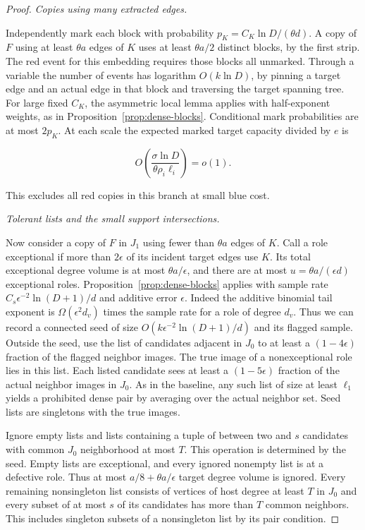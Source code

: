 \documentclass[11pt]{amsart}
\theoremstyle{definition}
\theoremstyle{remark}
\numberwithin{equation}{section}
\begin{document}
\begin{proof}
\medskip\noindent\emph{Copies using many extracted edges.}

Independently mark each block with probability $p_K=C_K\ln D/(\theta d)$. A copy of $ F $ using at least $\theta a $ edges of $ K $ uses at least $\theta a/2$ distinct blocks, by the first strip. The red event for this embedding requires those blocks all unmarked. Through a variable the number of events has logarithm $ O(k\ln D)$, by pinning a target edge and an actual edge in that block and traversing the target spanning tree. For large fixed $ C_K $, the asymmetric local lemma applies with half-exponent weights, as in Proposition~\ref{prop:dense-blocks}. Conditional mark probabilities are at most $2p_K $. At each scale the expected marked target capacity divided by $ e$ is

\begin{equation}
O\left(\frac{\sigma\ln D}{\theta\rho_i\ell_i}\right)=o(1).
\end{equation}

This excludes all red copies in this branch at small blue cost.

\medskip\noindent\emph{Tolerant lists and the small support intersections.}

Now consider a copy of $F $ in $ J_1$ using fewer than $\theta a $ edges of $ K $. Call a role exceptional if more than $2\epsilon $ of its incident target edges use $ K $. Its total exceptional degree volume is at most $\theta a/\epsilon $, and there are at most $ u=\theta a/(\epsilon d)$ exceptional roles. Proposition~\ref{prop:dense-blocks} applies with sample rate $ C_s\epsilon^{-2}\ln(D+1)/d $ and additive error $\epsilon $. Indeed the additive binomial tail exponent is $\Omega(\epsilon^2 d_v)$ times the sample rate for a role of degree $ d_v $. Thus we can record a connected seed of size $ O(k\epsilon^{-2}\ln(D+1)/d)$ and its flagged sample. Outside the seed, use the list of candidates adjacent in $ J_0$ to at least a $(1-4\epsilon)$ fraction of the flagged neighbor images. The true image of a nonexceptional role lies in this list. Each listed candidate sees at least a $(1-5\epsilon)$ fraction of the actual neighbor images in $ J_0$. As in the baseline, any such list of size at least $\ell_1$ yields a prohibited dense pair by averaging over the actual neighbor set. Seed lists are singletons with the true images.

Ignore empty lists and lists containing a tuple of between two and $s $ candidates with common $ J_0$ neighborhood at most $ T $. This operation is determined by the seed. Empty lists are exceptional, and every ignored nonempty list is at a defective role. Thus at most $ a/8+\theta a/\epsilon $ target degree volume is ignored. Every remaining nonsingleton list consists of vertices of host degree at least $ T $ in $ J_0$ and every subset of at most $ s $ of its candidates has more than $ T$ common neighbors. This includes singleton subsets of a nonsingleton list by its pair condition.


\end{proof}
\end{document}
